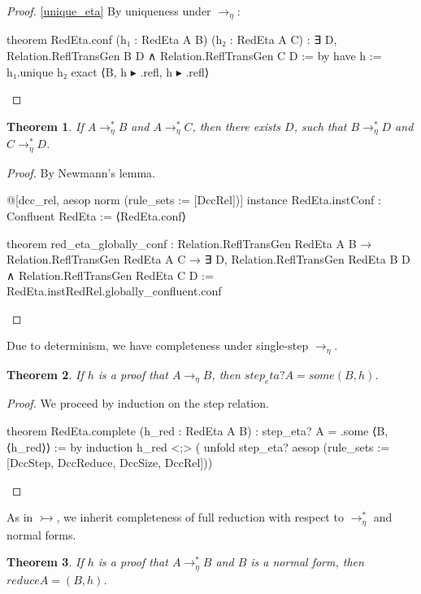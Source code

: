 \documentclass{article}
\newtheorem{theorem}{Theorem}
\newcommand{\affarr}{\rightarrowtail}
\newcommand{\etaarr}{\rightarrow_{\eta}}
\begin{document}
\begin{proof}\eqref{unique_eta}
  By uniqueness under \(\etaarr\):

\begin{leancode}
theorem RedEta.conf (h₁ : RedEta A B) (h₂ : RedEta A C) :
  ∃ D, Relation.ReflTransGen B D
  ∧ Relation.ReflTransGen C D := by
  have h := h₁.unique h₂
  exact ⟨B, h ▸ .refl, h ▸ .refl⟩
\end{leancode}
\end{proof}

\begin{theorem}
  If \(A \etaarr^{*} B\) and \(A \etaarr^{*} C\), then there exists \(D\), such that \(B \etaarr^{*} D\) and \(C \etaarr^{*} D\).
\end{theorem}

\begin{proof}
  By Newmann's lemma.
  \begin{leancode}
@[dcc_rel, aesop norm (rule_sets := [DccRel])]
instance RedEta.instConf : Confluent RedEta := ⟨RedEta.conf⟩

theorem red_eta_globally_conf : Relation.ReflTransGen RedEta A B → Relation.ReflTransGen RedEta A C → ∃ D,
  Relation.ReflTransGen RedEta B D ∧ Relation.ReflTransGen RedEta C D :=
  RedEta.instRedRel.globally_confluent.conf
\end{leancode}
\end{proof}

Due to determinism, we have completeness under single-step \(\etaarr\).

\begin{theorem}
  If \(h\) is a proof that \(A \etaarr B\), then \(step_eta? A = some (B, h)\).
\end{theorem}

\begin{proof}
  We proceed by induction on the step relation.

\begin{leancode}
theorem RedEta.complete (h_red : RedEta A B) : step_eta? A = .some ⟨B, ⟨h_red⟩⟩ := by
  induction h_red <;> (
    unfold step_eta?
    aesop (rule_sets := [DccStep, DccReduce, DccSize, DccRel]))
\end{leancode}
\end{proof}

As in \(\affarr\), we inherit completeness of full reduction with respect to \(\etaarr^{*}\) and normal forms.

\begin{theorem}
  If \(h\) is a proof that \(A \etaarr^{*} B\) and \(B\) is a normal form, then \(reduce A = (B, h)\).
\end{theorem}
\end{document}

